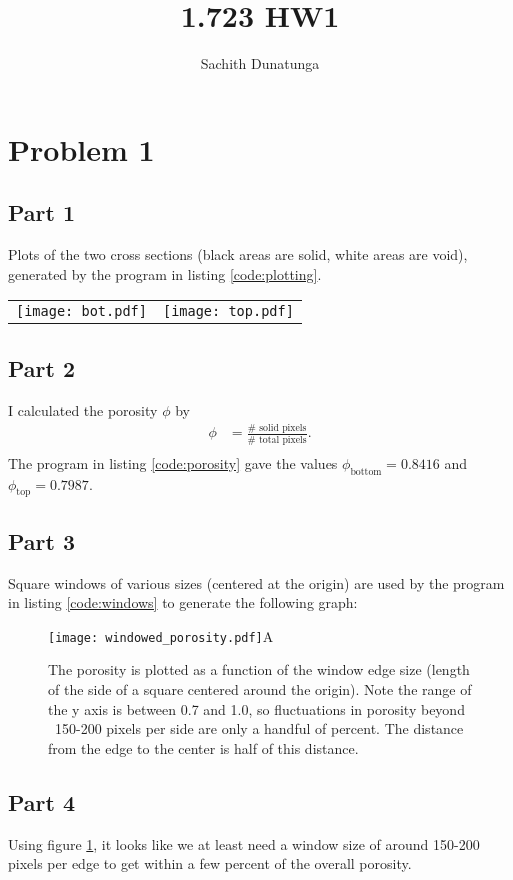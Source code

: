 \documentclass{article}
\title{1.723 HW1}
\author{Sachith  Dunatunga}
\begin{document}
\maketitle

%
%
%
\section{Problem 1}
\subsection{Part 1}
Plots of the two cross sections (black areas are solid, white areas are void), generated by the program in listing \ref{code:plotting}.

\begin{tabular}{c c}
\texttt{[image: bot.pdf]} & \texttt{[image: top.pdf]} \\
\end{tabular}

\subsection{Part 2}
I calculated the porosity $\phi$ by 
\begin{align}
    \phi &= \frac{\#\text{ solid pixels}}{\#\text{ total pixels}}. \\
\end{align}
The program in listing \ref{code:porosity} gave the values $\phi_{\mathrm{bottom}} = 0.8416$ and $\phi_{\mathrm{top}} = 0.7987$.

\subsection{Part 3}
Square windows of various sizes (centered at the origin) are used by the program in listing \ref{code:windows} to generate the following graph:
\begin{figure}[!h]
\centering
\texttt{[image: windowed\_porosity.pdf]}A
\caption{The porosity is plotted as a function of the window edge size (length of the side of a square centered around the origin). Note the range of the y axis is between 0.7 and 1.0, so fluctuations in porosity beyond ~150-200 pixels per side are only a handful of percent. The distance from the edge to the center is half of this distance.}
\label{fig:windows}
\end{figure}

\subsection{Part 4}
Using figure \ref{fig:windows}, it looks like we at least need a window size of around 150-200 pixels per edge to get within a few percent of the overall porosity.
%
%
%
\end{document}
